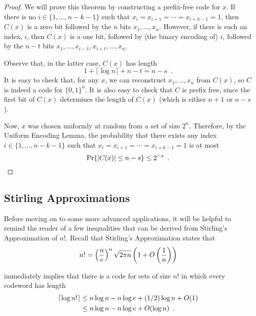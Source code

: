 \documentclass[lotsofwhite]{patmorin}
\begin{document}
\begin{proof}
  We will prove this theorem by constructing a prefix-free code
  for $x$. If there is no $i\in\{1,\ldots,n-k-1\}$ such that
  $x_i=x_{i+1}=\cdots=x_{i+k-1}=1$, then $C(x)$ is a zero bit followed
  by the $n$ bits $x_1,\ldots,x_n$.  However, if there is such an index,
  $i$, then $C(x)$ is a one bit, followed by (the binary encoding of)
  $i$, followed by the $n-t$ bits $x_1,\ldots,x_{i-1},x_{i+t},\ldots,x_n$.

  Observe that, in the latter case, $C(x)$ has length 
  \[
      1 + \lceil\log n\rceil + n - t = n-s \enspace .
  \]
  It is easy to check that, for any $x$, we can reconstruct
  $x_1,\ldots,x_n$ from $C(x)$, so $C$ is indeed a code for $\{0,1\}^n$.
  It is also easy to check that $C$ is prefix free, since the first bit of
  $C(x)$ determines the length of $C(x)$ (which is either $n+1$ or $n-s$).

  Now, $x$ was chosen uniformly at random from a set of size $2^{n}$.
  Therefore, by the Uniform Encoding Lemma, the probability
  that there exists any index $i\in\{1,\ldots,n-k-1\}$ such that
  $x_i=x_{i+1}=\cdots=x_{i+k-1}=1$ is at most
  \[
      \Pr\{|C(x)|\le n-s\} \le 2^{-s} \enspace . \qedhere 
  \]
\end{proof}

\subsection{Stirling Approximations}

Before moving on to some more advanced applications, it will be helpful
to remind the reader of a few inequalities that can be derived from
Stirling's Approximation of $n!$.  Recall that Stirling's Approximation
states that
\begin{equation}
  n! = \left(\frac{n}{e}\right)^n\sqrt{2\pi n}\left(1+O\left(\frac{1}{n}\right)\right) 
   \eqlabel{stirling}
\end{equation}

 immediately implies that there is a code for sets
of size $n!$ in which every codeword has length
\begin{align}
  \lceil \log n!\rceil 
      & \le n\log n - n\log e + (1/2)\log n + O(1)  
             \eqlabel{stirling-tight} \\
      & \le n\log n - n\log e + O(\log n)  
             \eqlabel{stirling-loose} \enspace .
\end{align}
\end{document}
